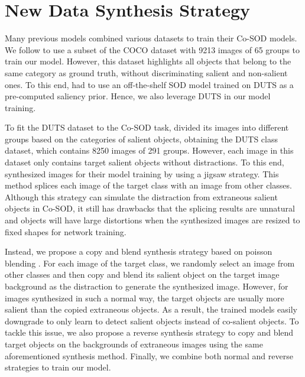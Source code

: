 \documentclass[10pt,twocolumn,letterpaper]{article}
\begin{document}
\section{New Data Synthesis Strategy}
Many previous models \cite{zhang2016co,han2017unified,li2018deep,li2019detecting} combined various datasets to train their Co-SOD models. We follow \cite{jin2020icnet} to use a subset of the COCO dataset \cite{lin2014microsoft} with 9213 images of 65 groups to train our model. However, this dataset highlights all objects that belong to the same category as ground truth, without discriminating salient and non-salient ones.
To this end, \cite{jin2020icnet} had to use an off-the-shelf SOD model \cite{zhao2019egnet} trained on DUTS \cite{wang2017learning} as a pre-computed saliency prior.
Hence, we also leverage DUTS \cite{wang2017learning} in our model training. 

To fit the DUTS dataset to the Co-SOD task, \cite{zhang2020gicd} divided its images into different groups based on the categories of salient objects, obtaining the DUTS class dataset, which contains 8250 images of 291 groups. However, each image in this dataset only contains target salient objects without distractions. To this end, \cite{zhang2020gicd} synthesized images for their model training by using a jigsaw strategy. This method splices each image of the target class with an image from other classes.
Although this strategy can simulate the distraction from extraneous salient objects in Co-SOD, it still has drawbacks that the splicing results are unnatural and objects will have large distortions when the synthesized images are resized to fixed shapes for network training.

Instead, we propose a copy and blend synthesis strategy based on poisson blending \cite{perez2003poisson}.
For each image of the target class, we randomly select an image from other classes and then copy and blend its salient object on the target image background as the distraction to generate the synthesized image.
However, for images synthesized in such a normal way, the target objects are usually more salient than the copied extraneous objects. As a result, the trained models easily downgrade to only learn to detect salient objects instead of co-salient objects. To tackle this issue, we also propose a reverse synthesis strategy to copy and blend target objects on the backgrounds of extraneous images using the same aforementioned synthesis method. Finally, we combine both normal and reverse strategies to train our model.
\end{document}
